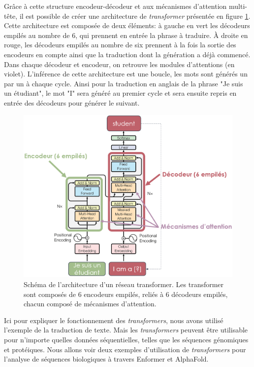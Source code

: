 Grâce à cette structure encodeur-décodeur et aux mécanismes d'attention multi-tête, il est possible de créer une architecture de \textit{transformer} présentée en figure \ref{fig:transformer}. Cette architecture est composée de deux éléments: à gauche en vert les décodeurs empilés au nombre de 6, qui prennent en entrée la phrase à traduire. À droite en rouge, les décodeurs empilés au nombre de six prennent à la fois la sortie des encodeurs en compte ainsi que la traduction dont la génération a déjà commencé. Dans chaque décodeur et encodeur, on retrouve les modules d'attentions (en violet). L'inférence de cette architecture est une boucle, les mots sont générés un par un à chaque cycle. Ainsi pour la traduction en anglais de la phrase "Je suis un étudiant",  le mot "I" sera généré au premier cycle et sera ensuite repris en entrée des décodeurs pour générer le suivant.
\begin{figure}[!ht]
 \centering
 \includegraphics[width=1\textwidth]{figures/transformer.png}
 \caption[Schéma de l'architecture d'un réseau Transformer]{Schéma de l'architecture d'un réseau transformer. Les transformer sont composés de 6 encodeurs empilés, reliés à 6 décodeurs empilés, chacun composé de mécanismes d'attention.}
 \label{fig:transformer}
\end{figure}
Ici pour expliquer le fonctionnement des \textit{transformers}, nous avons utilisé l'exemple de la traduction de texte. Mais les \textit{transformers} peuvent être utilisable pour n'importe quelles données séquentielles, telles que les séquences génomiques et protéiques. Nous allons voir deux exemples d'utilisation de \textit{transformers} pour l'analyse de séquences biologiques à travers Enformer et AlphaFold.


